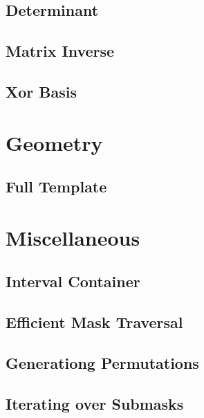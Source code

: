 \section{Determinant}


\section{Matrix Inverse}


\section{Xor Basis}


\chapter{Geometry}
\section{Full Template}


\chapter{Miscellaneous}
\section{Interval Container}


\section{Efficient Mask Traversal}


\section{Generationg Permutations}


\section{Iterating over Submasks}


